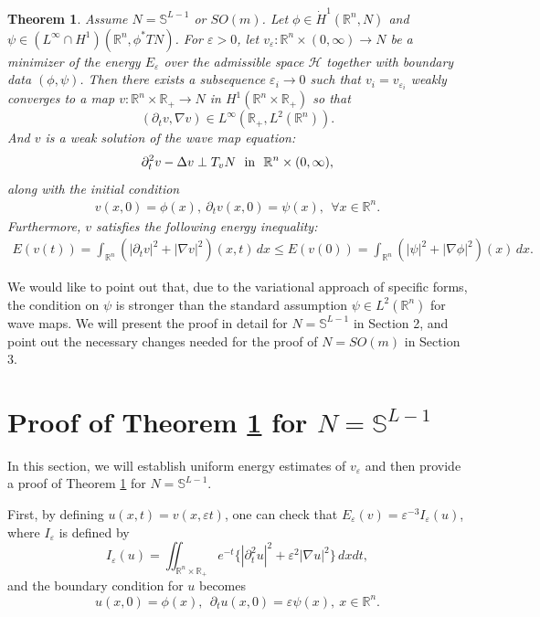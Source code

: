 \documentclass[12pt,twoside,reqno]{amsart}
\newtheorem{theorem}{Theorem}            %
\theoremstyle{definition}              %
\theoremstyle{remark}                  %
\newcommand{\R}{\mathbb{R}}                 %
\newcommand{\eps}{\varepsilon}
\renewcommand{\1}{\mathbbm{1}}                                      %
\numberwithin{equation}{section}
\numberwithin{definition}{section}
\numberwithin{theorem}{section}
\numberwithin{remark}{section}
\begin{document}
\begin{theorem}  \label{main} Assume $N=\mathbb{S}^{L-1}$ or
$SO(m)$. Let $\phi\in \dot{H}^1(\mathbb R^n, N)$
and $\psi\in (L^\infty\cap {H}^1)(\mathbb R^n, \phi^*TN)$. For $\eps>0$, let
$v_\eps:\R^n\times (0,\infty)\to N$
be a minimizer of the energy
${E}_\eps$ over the admissible space $\mathcal{H}$ together with boundary data $(\phi,\psi)$. Then there exists a subsequence $\eps_i\to 0$ such that $v_i=v_{\eps_i}$ weakly converges to 
a map $v:\mathbb{R}^n\times \R_+\to 
N$ in $H^1(\R^n\times \mathbb{R}_+)$ so that
$$
(\partial_tv, \nabla v)\in L^\infty(\mathbb{R}_+, L^2(\mathbb R^n)).
$$
And $v$ is a weak solution of the wave map equation:
\begin{align}
\partial_t^2v-\Delta v \perp T_v N \ 
\ {\rm{in}}\ \ \mathbb{R}^n\times (0,\infty),   
\end{align}
along with the initial condition
\begin{align}
v(x,0)=\phi(x),\  \partial_tv(x,0)=\psi(x),
\ \ \forall x\in\mathbb{R}^n.
\end{align}
Furthermore, $v$ satisfies the following energy inequality:
\begin{align}
E(v(t))=\int_{\mathbb{R}^n}
(|\partial_tv|^2+|\nabla v|^2)(x,t)\,dx
\le E(v(0))=\int_{\mathbb{R}^n}
(|\psi|^2+|\nabla \phi|^2)(x)\,dx.
\end{align}
\end{theorem}

We would like to point out that, due to the variational approach
of specific forms, the condition on $\psi$ is stronger than the standard assumption $\psi\in L^2(\R^n)$ for wave maps.
We will present the proof in detail for $N=\mathbb{S}^{L-1}$ in Section 2, and point out the necessary changes needed for
the proof of $N=SO(m)$ in Section 3. 

\bigskip

\section{Proof of Theorem \ref{main} for $N=\mathbb{S}^{L-1}$}

In this section, we will establish uniform energy estimates
of $v_\eps$ and then provide a proof of Theorem \ref{main} for
$N=\mathbb{S}^{L-1}.$

First, by defining $u(x,t)=v(x, \eps t)$, one can check that
$E_\eps(v)=\eps^{-3}I_\eps(u)$, where
$I_\eps$ is defined by
\begin{equation}
I_\eps(u)=\iint_{\mathbb R^n\times\R_+} e^{-t}
\Big\{|\partial_t^2 u|^2+{\eps^2}|\nabla u|^2\Big\}\,dxdt,
\end{equation}
and the boundary condition for $u$ becomes
\begin{equation}\label{bdrycond}
u(x,0)=\phi(x), 
\ \ \partial_tu(x,0)=\eps \psi(x), \ x\in\mathbb{R}^n.
\end{equation}
\end{document}
